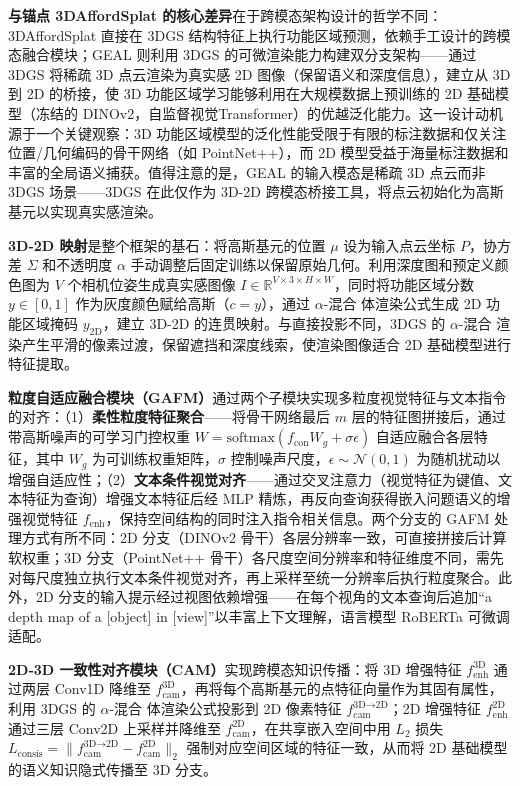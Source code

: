 \textbf{与锚点 3DAffordSplat 的核心差异}在于跨模态架构设计的哲学不同：3DAffordSplat 直接在 3DGS 结构特征上执行功能区域预测，依赖手工设计的跨模态融合模块；GEAL 则利用 3DGS 的可微渲染能力构建双分支架构——通过 3DGS 将稀疏 3D 点云渲染为真实感 2D 图像（保留语义和深度信息），建立从 3D 到 2D 的桥接，使 3D 功能区域学习能够利用在大规模数据上预训练的 2D 基础模型（冻结的 DINOv2，自监督视觉Transformer）的优越泛化能力。这一设计动机源于一个关键观察：3D 功能区域模型的泛化性能受限于有限的标注数据和仅关注位置/几何编码的骨干网络（如 PointNet++），而 2D 模型受益于海量标注数据和丰富的全局语义捕获。值得注意的是，GEAL 的输入模态是稀疏 3D 点云而非 3DGS 场景——3DGS 在此仅作为 3D-2D 跨模态桥接工具，将点云初始化为高斯基元以实现真实感渲染。

\textbf{3D-2D 映射}是整个框架的基石：将高斯基元的位置 $\mu$ 设为输入点云坐标 $P$，协方差 $\Sigma$ 和不透明度 $\alpha$ 手动调整后固定训练以保留原始几何。利用深度图和预定义颜色图为 $V$ 个相机位姿生成真实感图像 $I \in \mathbb{R}^{V \times 3 \times H \times W}$，同时将功能区域分数 $y \in [0,1]$ 作为灰度颜色赋给高斯（$c = y$），通过 $\alpha$-混合 体渲染公式生成 2D 功能区域掩码 $y_\text{2D}$，建立 3D-2D 的连贯映射。与直接投影不同，3DGS 的 $\alpha$-混合 渲染产生平滑的像素过渡，保留遮挡和深度线索，使渲染图像适合 2D 基础模型进行特征提取。

\textbf{粒度自适应融合模块（GAFM）}通过两个子模块实现多粒度视觉特征与文本指令的对齐：（1）\textbf{柔性粒度特征聚合}——将骨干网络最后 $m$ 层的特征图拼接后，通过带高斯噪声的可学习门控权重 $W = \text{softmax}(f_\text{con} W_g + \sigma \epsilon)$ 自适应融合各层特征，其中 $W_g$ 为可训练权重矩阵，$\sigma$ 控制噪声尺度，$\epsilon \sim \mathcal{N}(0,1)$ 为随机扰动以增强自适应性；（2）\textbf{文本条件视觉对齐}——通过交叉注意力（视觉特征为键值、文本特征为查询）增强文本特征后经 MLP 精炼，再反向查询获得嵌入问题语义的增强视觉特征 $f_\text{enh}$，保持空间结构的同时注入指令相关信息。两个分支的 GAFM 处理方式有所不同：2D 分支（DINOv2 骨干）各层分辨率一致，可直接拼接后计算软权重；3D 分支（PointNet++ 骨干）各尺度空间分辨率和特征维度不同，需先对每尺度独立执行文本条件视觉对齐，再上采样至统一分辨率后执行粒度聚合。此外，2D 分支的输入提示经过视图依赖增强——在每个视角的文本查询后追加``a depth map of a [object] in [view]''以丰富上下文理解，语言模型 RoBERTa 可微调适配。

\textbf{2D-3D 一致性对齐模块（CAM）}实现跨模态知识传播：将 3D 增强特征 $f_\text{enh}^\text{3D}$ 通过两层 Conv1D 降维至 $f_\text{cam}^\text{3D}$，再将每个高斯基元的点特征向量作为其固有属性，利用 3DGS 的 $\alpha$-混合 体渲染公式投影到 2D 像素特征 $f_\text{cam}^{\text{3D} \to \text{2D}}$；2D 增强特征 $f_\text{enh}^\text{2D}$ 通过三层 Conv2D 上采样并降维至 $f_\text{cam}^\text{2D}$，在共享嵌入空间中用 $L_2$ 损失 $L_\text{consis} = \|f_\text{cam}^{\text{3D} \to \text{2D}} - f_\text{cam}^\text{2D}\|_2$ 强制对应空间区域的特征一致，从而将 2D 基础模型的语义知识隐式传播至 3D 分支。

